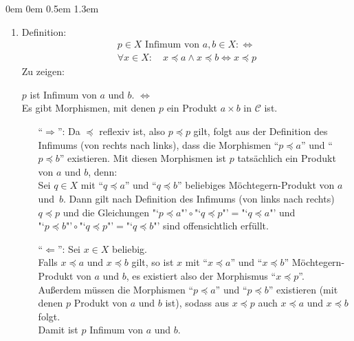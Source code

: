 \documentclass[a4paper,ngerman]{scrartcl}
\theoremstyle{definition}
\theoremstyle{plain}
\theoremstyle{remark}
\newcommand{\C}{\mathcal{C}}
\begin{document}
\begin{list}{}{0em \leftmargin0em \itemindent0.5em \itemsep 1.3em}
\begin{enumerate}
\item
Definition:
\begin{align*}
p\in X\text{ Infimum von }a,b\in X :\Longleftrightarrow\\
\forall x\in X{:}\quad x\preceq a \wedge x\preceq b \Longleftrightarrow x\preceq p
\end{align*}
Zu zeigen:
\begin{center}
$p$ ist Infimum von $a$ und $b$. $\Longleftrightarrow$\\
Es gibt Morphismen, mit denen $p$ ein Produkt $a\times b$ in $\C$ ist.
\end{center}
\begin{itemize}
\item["`$\Rightarrow$"':] Da $\preceq$ reflexiv ist, also $p\preceq p$ gilt, folgt aus der Definition des Infimums (von rechts nach links), dass die Morphismen "`$p\preceq a$"' und "`$p\preceq b$"' existieren. Mit diesen Morphismen ist $p$ tatsächlich ein Produkt von $a$ und $b$, denn:\\
Sei $q\in X$ mit "`$q\preceq a$"' und "`$q\preceq b$"' beliebiges Möchtegern-Produkt von $a$ und~$b$. Dann gilt nach Definition des Infimums (von links nach rechts) $q\preceq p$ und die Gleichungen $\text{"`$p\preceq a$"'}\circ\text{"`$q\preceq p$"'}=\text{"`$q\preceq a$"'}$ und $\text{"`$p\preceq b$"'}\circ\text{"`$q\preceq p$"'}=\text{"`$q\preceq b$"'}$ sind offensichtlich erfüllt.
\item["`$\Leftarrow$"':] Sei $x\in X$ beliebig.\\
Falls $x\preceq a$ und $x\preceq b$ gilt, so ist $x$ mit "`$x\preceq a$"' und "`$x\preceq b$"' Möchtegern-Produkt von $a$ und $b$, es existiert also der Morphismus "`$x\preceq p$"'.\\
Außerdem müssen die Morphismen "`$p\preceq a$"' und "`$p\preceq b$"' existieren (mit denen $p$ Produkt von $a$ und $b$ ist), sodass aus $x\preceq p$ auch $x\preceq a$ und $x\preceq b$ folgt.\\
Damit ist $p$ Infimum von $a$ und $b$.
\end{itemize}
\end{enumerate}
\end{list}
\end{document}
